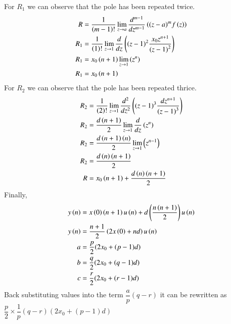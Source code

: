 \documentclass[journal,12pt,twocolumn]{IEEEtran}
\theoremstyle{remark}
\begin{document}
For $R_1$ we can observe that the pole has been repeated twice.
\begin{align}
    R&=\frac{1}{\left(m-1\right)!}\lim\limits_{z\to a}\frac{d^{m-1}}{dz^{m-1}}\left({(z-a)}^{m}f\left(z\right)\right)  \\
    R_1&=\frac{1}{\left(1\right)!}\lim\limits_{z\to 1}\frac{d}{dz}\left({(z-1)}^{2}\frac{x_0z^{n+1}}{{(z-1)}^2}\right)\\
    R_1&=x_0\left(n+1\right)\lim\limits_{z\to 1}\left(z^n\right)\\
    R_1&=x_0\left(n+1\right)
\end{align}
For $R_2$ we can observe that the pole has been repeated thrice.
\begin{align}
    R_2&=\frac{1}{\left(2\right)!}\lim\limits_{z\to 1}\frac{d^{2}}{dz^{2}}\left({(z-1)}^{3}\frac{dz^{n+1}}{{(z-1)}^3}\right)\\
    R_2&=\frac{d\left(n+1\right)}{2}\lim\limits_{z\to 1}\frac{d}{dz}\left(z^n\right)\\
    R_2&=\frac{d\left(n+1\right)\left(n\right)}{2}\lim\limits_{z\to 1}\left(z^{n-1}\right)\\
    R_2&=\frac{d\left(n\right)\left(n+1\right)}{2}\\
    R&=x_0\left(n+1\right)+\frac{d\left(n\right)\left(n+1\right)}{2}
\end{align}
Finally,
\begin{align}
    y\left(n\right)&=x\left(0\right)\left(n+1\right)u\left(n\right)+d\left(\dfrac{{n\left(n+1\right)}}{2}\right)u\left(n\right)\\
    y\left(n\right)&=\dfrac{n+1}{2}\left(2x\left(0\right)+nd\right)u\left(n\right)\\
    a&=\dfrac{p}{2}(2x_0+(p-1)d)\\
    b&=\dfrac{q}{2}(2x_0+(q-1)d)\\
    c&=\dfrac{r}{2}(2x_0+(r-1)d)
\end{align}
Back substituting values into the term $\dfrac{a}{p}(q-r)$ it can be rewritten as $\dfrac{p}{2} \times \dfrac{1}{p}(q-r)(2x_0+(p-1)d)$
\end{document}
